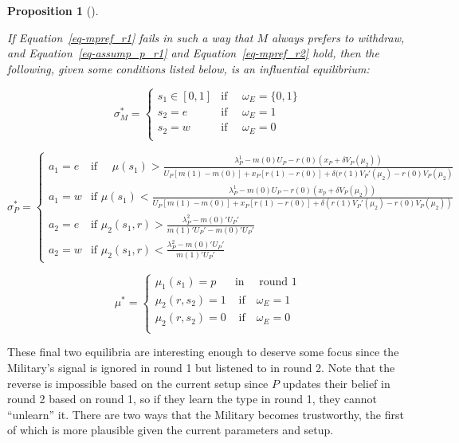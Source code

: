 \documentclass[
  12pt,
]{article}
\theoremstyle{plain}
\theoremstyle{plain}
\newtheorem{proposition}{Proposition}[section]
\theoremstyle{remark}
\begin{document}
\begin{proposition}[]\protect\hypertarget{prp-transition2}{}\label{prp-transition2}

If Equation~\ref{eq-mpref_r1} fails in such a way that \(M\) always
prefers to withdraw, and Equation~\ref{eq-assump_p_r1} and
Equation~\ref{eq-mpref_r2} hold, then the following, given some
conditions listed below, is an influential equilibrium:

\[
\sigma^{*}_M = 
\begin{cases}
s_1 \in [0, 1] & \text{if } \quad \omega_E = \{0, 1\} \\
s_2 = e  & \text{if } \quad \omega_E = 1\\
s_2 = w  & \text{if } \quad \omega_E = 0\\
\end{cases}
\]

\[
\sigma^{*}_P = 
\begin{cases}
a_1= e  & \text{if } \quad\mu(s_1)
> \frac{\lambda^1_P - m(0)U_P - r(0)(x_P + \delta V_P(\mu_2))}
 {U_P[ m(1) - m(0) ]+ x_P [r(1) -r(0)] 
 + \delta (r(1)V_P'(\mu_2) - r(0)V_P(\mu_2)}\\
a_1 = w  & \text{if } \mu(s_1)
< \frac{\lambda^1_P - m(0)U_P - r(0)(x_p + \delta V_P(\mu_2))}
 {U_P[ m(1) - m(0) ]+ x_P [r(1) -r(0)] 
 + \delta (r(1)V_P'(\mu_2) - r(0)V_P(\mu_2))}\\
a_2 = e & \text{if } \mu_2(s_1, r) > \frac{\lambda^2_P - m(0)' U_P '}{m(1)' U_P' - m(0)' U_P'}\\
a_2 = w & \text{if } \mu_2(s_1, r) < \frac{\lambda^2_P - m(0)' U_P '}{m(1)' U_P'}
\end{cases}
\]

\[
\mu^* = 
\begin{cases}
\mu_1(s_1) = p  & \text{in } \quad \text{round 1}\\
\mu_2(r, s_2) = 1 & \text{ if} \quad \omega_E = 1\\
\mu_2(r, s_2) = 0 & \text{ if} \quad \omega_E = 0\\
\end{cases}
\]

\end{proposition}

These final two equilibria are interesting enough to deserve some focus
since the Military's signal is ignored in round 1 but listened to in
round 2. Note that the reverse is impossible based on the current setup
since \(P\) updates their belief in round 2 based on round 1, so if they
learn the type in round 1, they cannot ``unlearn'' it. There are two
ways that the Military becomes trustworthy, the first of which is more
plausible given the current parameters and setup.
\end{document}
